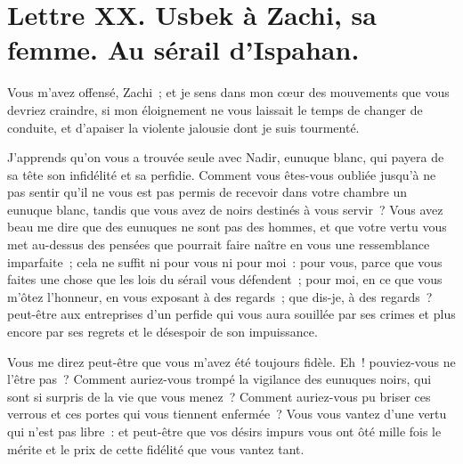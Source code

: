 \documentclass[french,twoside]{book} %
\begin{document}
\section[{Lettre XX. Usbek à Zachi, sa femme. Au sérail d’Ispahan.}]{Lettre XX. Usbek à Zachi, sa femme. Au sérail d’Ispahan.}\renewcommand{\leftmark}{Lettre XX. Usbek à Zachi, sa femme. Au sérail d’Ispahan.}

\noindent Vous m’avez offensé, Zachi ; et je sens dans mon cœur des mouvements que vous devriez craindre, si mon éloignement ne vous laissait le temps de changer de conduite, et d’apaiser la violente jalousie dont je suis tourmenté.\par
J’apprends qu’on vous a trouvée seule avec Nadir, eunuque blanc, qui payera de sa tête son infidélité et sa perfidie. Comment vous êtes-vous oubliée jusqu’à ne pas sentir qu’il ne vous est pas permis de recevoir dans votre chambre un eunuque blanc, tandis que vous avez de noirs destinés à vous servir ? Vous avez beau me dire que des eunuques ne sont pas des hommes, et que votre vertu vous met au-dessus des pensées que pourrait faire naître en vous une ressemblance imparfaite ; cela ne suffit ni pour vous ni pour moi : pour vous, parce que vous faites une chose que les lois du sérail vous défendent ; pour moi, en ce que vous m’ôtez l’honneur, en vous exposant à des regards ; que dis-je, à des regards ? peut-être aux entreprises d’un perfide qui vous aura souillée par ses crimes et plus encore par ses regrets et le désespoir de son impuissance.\par
Vous me direz peut-être que vous m’avez été toujours fidèle. Eh ! pouviez-vous ne l’être pas ? Comment auriez-vous trompé la vigilance des eunuques noirs, qui sont si surpris de la vie que vous menez ? Comment auriez-vous pu briser ces verrous et ces portes qui vous tiennent enfermée ? Vous vous vantez d’une vertu qui n’est pas libre : et peut-être que vos désirs impurs vous ont ôté mille fois le mérite et le prix de cette fidélité que vous vantez tant.\par
\end{document}
